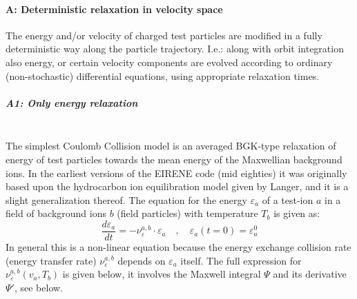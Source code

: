 \paragraph{A: Deterministic relaxation in velocity space}
The energy and/or velocity of charged test particles are modified in a fully deterministic way along the
particle trajectory. I.e.: along with orbit integration also energy, or certain velocity components
are evolved according to ordinary (non-stochastic) differential equations, using appropriate relaxation times.
\subparagraph{A1: Only energy relaxation}\hfill \\
The simplest Coulomb Collision model is an averaged BGK-type
relaxation of energy of test particles towards the mean energy of the Maxwellian
background ions. In the earliest versions of the EIRENE code (mid
eighties) it was originally based upon the hydrocarbon ion
equilibration model given by Langer, \cite{kn:Langer} and it is a slight
generalization thereof. The equation for the energy $\varepsilon_a$ of
a test-ion $a$ in a field of background ions $b$ (field particles) with temperature
$T_b$ is given as:
\begin{equation}\label{eq.relax1}
\frac{d\varepsilon_a}{dt}=-\nu_\varepsilon^{a,b} \cdot
\varepsilon_a  \quad , \quad  \varepsilon_a(t=0)=\varepsilon_a^0
\end{equation}
In general this is a non-linear equation because the energy exchange collision
rate (energy transfer rate) $\nu_\varepsilon^{a,b}$ depends on
$\varepsilon_a$ itself. The full expression for $\nu_\varepsilon^{a,b}(v_a, T_b)$ is given below, it involves
the Maxwell integral $\Psi$ and its derivative $\Psi'$, see below.



